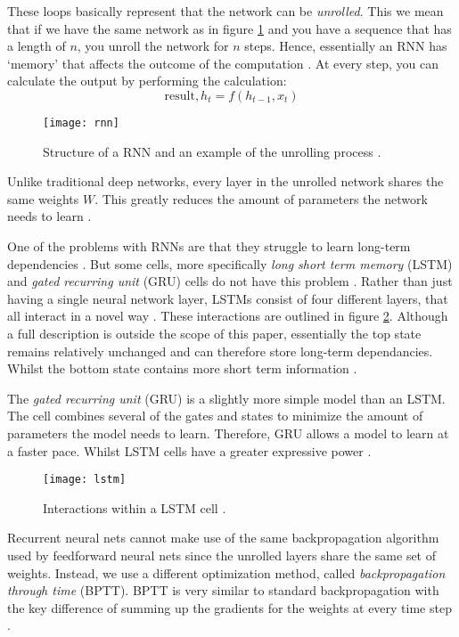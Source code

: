 These loops basically represent that the network can be \textit{unrolled}.
This we mean that if we have the same network as in figure \ref{fig:rnn} and you have a sequence that has a length of $n$, you unroll the network for $n$ steps.
Hence, essentially an RNN has `memory' that affects the outcome of the computation \cite{britz_2016}.
At every step, you can calculate the output by performing the calculation:
$$\text{result}, h_t = f(h_{t - 1}, x_t)$$

\begin{figure}[ht]
  \centering
  \texttt{[image: rnn]}
  \caption{Structure of a RNN and an example of the unrolling process \cite{britz_2016}.}
  \label{fig:rnn}
\end{figure}

Unlike traditional deep networks, every layer in the unrolled network shares the same weights $W$.
This greatly reduces the amount of parameters the network needs to learn \cite{britz_2016}.

One of the problems with RNNs are that they struggle to learn long-term dependencies \cite{bengio1994learning}.
But some cells, more specifically \textit{long short term memory} (LSTM) and \textit{gated recurring unit} (GRU) cells do not have this problem \cite{hochreiter1997long,LSTM,cho2014learning}.
Rather than just having a single neural network layer, LSTMs consist of four different layers, that all interact in a novel way \cite{LSTM}.
These interactions are outlined in figure \ref{fig:lstm}.
Although a full description is outside the scope of this paper, essentially the top state remains relatively unchanged and can therefore store long-term dependancies.
Whilst the bottom state contains more short term information \cite{LSTM,hochreiter1997long}.

The \textit{gated recurring unit} (GRU) is a slightly more simple model than an LSTM.
The cell combines several of the gates and states to minimize the amount of parameters the model needs to learn.
Therefore, GRU allows a model to learn at a faster pace.
Whilst LSTM cells have a greater expressive power \cite{hochreiter1997long,LSTM,cho2014learning}.

\begin{figure}[ht]
  \centering
  \texttt{[image: lstm]}
  \caption{Interactions within a LSTM cell \cite{LSTM}.}
  \label{fig:lstm}
\end{figure}

Recurrent neural nets cannot make use of the same backpropagation algorithm used by feedforward neural nets since the unrolled layers share the same set of weights.
Instead, we use a different optimization method, called \textit{backpropagation through time} (BPTT).
BPTT is very similar to standard backpropagation with the key difference of summing up the gradients for the weights at every time step \cite{britz_2016}.

